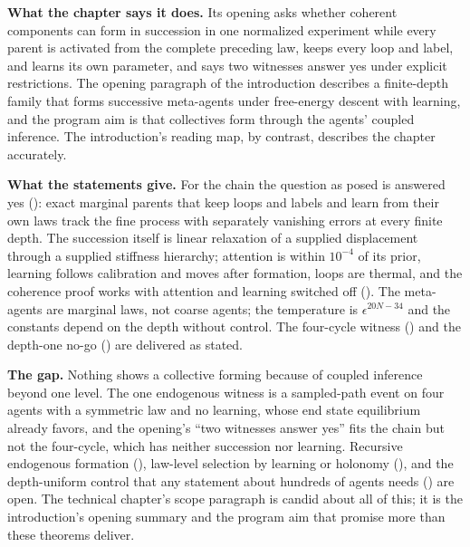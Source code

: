 \begin{verdictbox}{\NARROWER}
\textbf{What the chapter says it does.} Its opening asks whether coherent components can form in succession
in one normalized experiment while every parent is activated from the complete preceding law, keeps every
loop and label, and learns its own parameter, and says two witnesses answer yes under explicit restrictions.
The opening paragraph of the introduction describes a finite-depth family that forms successive meta-agents
under free-energy descent with learning, and the program aim is that collectives form through the agents'
coupled inference. The introduction's reading map, by contrast, describes the chapter accurately.

\textbf{What the statements give.} For the chain the question as posed is answered yes
(): exact marginal parents that keep loops and labels and learn from
their own laws track the fine process with separately vanishing errors at every finite depth. The succession
itself is linear relaxation of a supplied displacement through a supplied stiffness hierarchy; attention is
within \(10^{-4}\) of its prior, learning follows calibration and moves after formation, loops are thermal,
and the coherence proof works with attention and learning switched off ().
The meta-agents are marginal laws, not coarse agents; the temperature is \(\epsilon^{20N-34}\) and the
constants depend on the depth without control. The four-cycle witness ()
and the depth-one no-go () are delivered as stated.

\textbf{The gap.} Nothing shows a collective forming because of coupled inference beyond one level. The one
endogenous witness is a sampled-path event on four agents with a symmetric law and no learning, whose end
state equilibrium already favors, and the opening's ``two witnesses answer yes'' fits the chain but not the
four-cycle, which has neither succession nor learning. Recursive endogenous formation
(), law-level selection by learning or holonomy
(), and the depth-uniform control that any statement about hundreds of
agents needs () are open. The technical chapter's scope paragraph is
candid about all of this; it is the introduction's opening summary and the program aim that promise more
than these theorems deliver.
\end{verdictbox}
